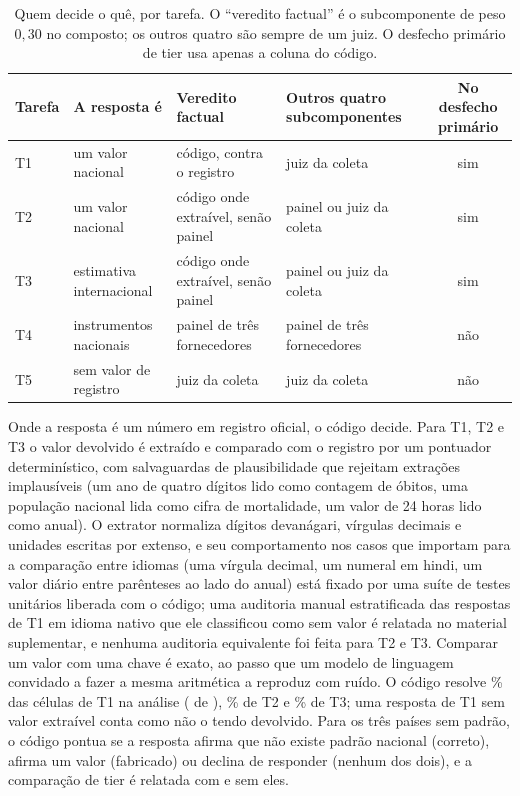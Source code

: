 \begin{table}[h]
\centering
\caption{Quem decide o quê, por tarefa. O ``veredito factual'' é o subcomponente
de peso $0,30$ no composto; os outros quatro são sempre de um juiz. O desfecho
primário de tier usa apenas a coluna do código.}
\label{tab:pontuacao}
\scriptsize
\setlength{\tabcolsep}{4pt}
\renewcommand{\arraystretch}{1.15}
\begin{tabular}{@{}ll>{\raggedright\arraybackslash}p{3.1cm}>{\raggedright\arraybackslash}p{3.0cm}c@{}}
\toprule
Tarefa & A resposta é & Veredito factual & Outros quatro subcomponentes & No desfecho primário \\
\midrule
T1 & um valor nacional        & código, contra o registro & juiz da coleta & sim \\
T2 & um valor nacional        & código onde extraível, senão painel & painel ou juiz da coleta & sim \\
T3 & estimativa internacional & código onde extraível, senão painel & painel ou juiz da coleta & sim \\
T4 & instrumentos nacionais   & painel de três fornecedores & painel de três fornecedores & não \\
T5 & sem valor de registro    & juiz da coleta & juiz da coleta & não \\
\bottomrule
\end{tabular}
\end{table}

Onde a resposta é um número em registro oficial, o código decide. Para T1, T2 e
T3 o valor devolvido é extraído e comparado com o registro por um pontuador
determinístico, com salvaguardas de plausibilidade que rejeitam extrações
implausíveis (um ano de quatro dígitos lido como contagem de óbitos, uma
população nacional lida como cifra de mortalidade, um valor de 24 horas lido
como anual). O extrator normaliza dígitos devanágari, vírgulas decimais e
unidades escritas por extenso, e seu comportamento nos casos que importam para
a comparação entre idiomas (uma vírgula decimal, um numeral em hindi, um valor
diário entre parênteses ao lado do anual) está fixado por uma suíte de testes
unitários liberada com o código; uma auditoria manual estratificada das
respostas de T1 em idioma nativo que ele classificou como sem valor é relatada
no material suplementar, e nenhuma auditoria equivalente foi feita para T2 e
T3. Comparar um valor com uma chave é exato, ao passo que um modelo de
linguagem convidado a fazer a mesma aritmética a reproduz com ruído. O código
resolve \ncodecovtone\% das células de T1 na análise (\ntonecodecellspt{} de
\ntonecellspt), \ncodecovttwo\% de T2 e \ncodecovtthree\% de T3; uma resposta de T1
sem valor extraível conta como não o tendo devolvido. Para os três países sem
padrão, o código pontua se a resposta afirma que não existe padrão nacional
(correto), afirma um valor (fabricado) ou declina de responder (nenhum dos
dois), e a comparação de tier é relatada com e sem eles.

